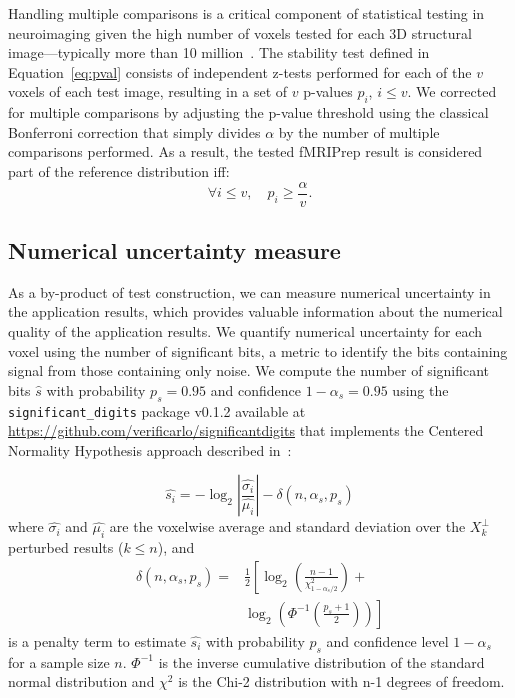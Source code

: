 \documentclass[lettersize,journal]{IEEEtran}
\newcommand{\fmriprep}{fMRIPrep\xspace}
\begin{document}
Handling multiple comparisons is a critical component of statistical testing in neuroimaging given the high number of voxels tested for each 3D structural image---typically more than 10 million~\cite{NICHOLS2007246}. The stability test defined in Equation~\ref{eq:pval} consists of independent z-tests performed for each of the $v$ voxels of each test image, resulting in a set of $v$ p-values $p_i$, $i \leq v$. We corrected for multiple comparisons by adjusting the p-value threshold using the classical Bonferroni correction that simply divides $\alpha$ by the number of multiple comparisons performed. As a result, the tested \fmriprep result is considered part of the reference distribution iff:
\begin{equation}
    \label{eq:bonferroni}
    \forall i \leq v, \quad p_i \geq \frac{\alpha}{v}.
\end{equation}

\subsection{Numerical uncertainty measure}

As a by-product of test construction, we can measure numerical uncertainty in the application results, which provides valuable information about the numerical quality of the application results.
We quantify numerical uncertainty for each voxel using the number of significant bits, a metric to identify the bits containing signal from those containing only noise. We compute the number of significant bits $\hat{s}$ with probability $p_s=0.95$ and confidence $1-\alpha_s=0.95$ using the \texttt{significant\_digits} package v0.1.2 available at \url{https://github.com/verificarlo/significantdigits} that implements the Centered Normality Hypothesis approach described in~\cite{sohier2021confidence}:

\[
    \hat{s_i} = -\log_2 \left| \frac{\hat{\sigma_i}}{\hat{\mu_i}} \right| - \delta(n, \alpha_s, p_s)
\]
where $\hat{\sigma_i}$ and $\hat{\mu_i}$ are the voxelwise average and standard deviation over the $X_k^\perp$ perturbed results ($k \leq n$), and
\begin{equation}
    \begin{split}
        \delta(n, \alpha_s, p_s) =& \frac{1}{2} \left[ \log_2 \left( \frac{n-1}{\chi^2_{1-\alpha_s/2}} \right) + \right. \\
            &  \left. \log_2 \left( \Phi^{-1} \left( \frac{p_s+1}{2} \right) \right) \right]
    \end{split}
\end{equation}
is a penalty term to estimate $\hat{s_i}$ with probability $p_s$ and confidence level $1-\alpha_s$ for a sample size $n$. $\Phi^{-1}$ is the inverse cumulative distribution of the standard normal distribution and $\chi^2$ is the Chi-2 distribution with n-1 degrees of freedom.
\end{document}
